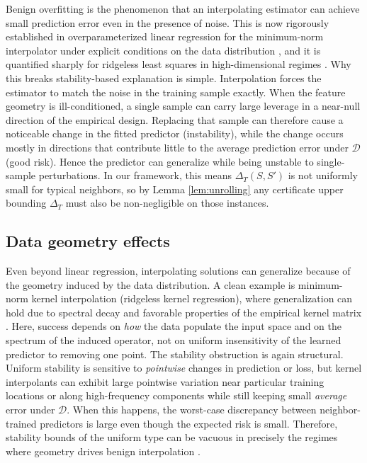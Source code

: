 \documentclass{article}
\numberwithin{equation}{section}
\begin{document}
Benign overfitting is the phenomenon that an interpolating estimator can achieve small prediction error even in the presence of noise. This is now rigorously established in overparameterized linear regression for the minimum-norm interpolator under explicit conditions on the data distribution \cite{BartlettLongLugosiTsigler2020}, and it is quantified sharply for ridgeless least squares in high-dimensional regimes \cite{HastieMontanariRossetTibshirani2022}. Why this breaks stability-based explanation is simple. Interpolation forces the estimator to match the noise in the training sample exactly. When the feature geometry is ill-conditioned, a single sample can carry large leverage in a near-null direction of the empirical design. Replacing that sample can therefore cause a noticeable change in the fitted predictor (instability), while the change occurs mostly in directions that contribute little to the average prediction error under $\mathcal{D}$ (good risk). Hence the predictor can generalize while being unstable to single-sample perturbations. In our framework, this means $\Delta_T(S,S')$ is not uniformly small for typical neighbors, so by Lemma \ref{lem:unrolling} any certificate upper bounding $\Delta_T$ must also be non-negligible on those instances.

\subsection{Data geometry effects}
\label{subsec:data-geometry}

Even beyond linear regression, interpolating solutions can generalize because of the geometry induced by the data distribution. A clean example is minimum-norm kernel interpolation (ridgeless kernel regression), where generalization can hold due to spectral decay and favorable properties of the empirical kernel matrix \cite{LiangRakhlin2020}. Here, success depends on \emph{how} the data populate the input space and on the spectrum of the induced operator, not on uniform insensitivity of the learned predictor to removing one point. The stability obstruction is again structural. Uniform stability is sensitive to \emph{pointwise} changes in prediction or loss, but kernel interpolants can exhibit large pointwise variation near particular training locations or along high-frequency components while still keeping small \emph{average} error under $\mathcal{D}$. When this happens, the worst-case discrepancy between neighbor-trained predictors is large even though the expected risk is small. Therefore, stability bounds of the uniform type can be vacuous in precisely the regimes where geometry drives benign interpolation \cite{LiangRakhlin2020}.
\end{document}
